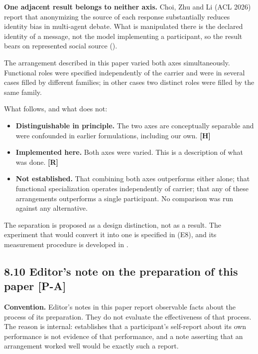 \textbf{One adjacent result belongs to neither axis.} \gcheck{} Choi, Zhu and Li (ACL 2026) report that anonymizing the source of each response substantially reduces identity bias in multi-agent debate. What is manipulated there is the declared identity of a message, not the model implementing a participant, so the result bears on represented social source ().
\nocite{choi2026identity}

The arrangement described in this paper varied both axes simultaneously. Functional roles were specified independently of the carrier and were in several cases filled by different families; in other cases two distinct roles were filled by the same family.

What follows, and what does not:

\begin{itemize}
  \item \textbf{Distinguishable in principle.} The two axes are conceptually separable and were confounded in earlier formulations, including our own. \textbf{[H]}
  \item \textbf{Implemented here.} Both axes were varied. This is a description of what was done. \textbf{[R]}
  \item \textbf{Not established.} That combining both axes outperforms either alone; that functional specialization operates independently of carrier; that any of these arrangements outperforms a single participant. No comparison was run against any alternative.
\end{itemize}
The separation is proposed as a design distinction, not as a result. The experiment that would convert it into one is specified in  (E8), and its measurement procedure is developed in .


\subsection*{8.10 Editor's note on the preparation of this paper \textbf{[P-A]}}
\label{sec:en:8.10}

\textbf{Convention.} Editor's notes in this paper report observable facts about the process of its preparation. They do not evaluate the effectiveness of that process. The reason is internal:  establishes that a participant's self-report about its own performance is not evidence of that performance, and a note asserting that an arrangement worked well would be exactly such a report.

